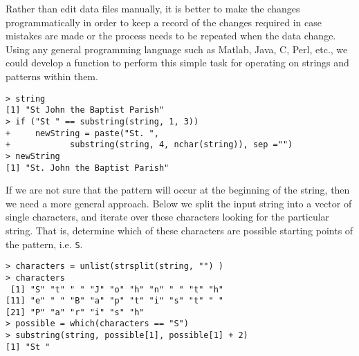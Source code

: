 Rather than edit data files manually, it is better to make the changes
programmatically in order to keep a record of the changes required in
case mistakes are made or the process needs to be repeated when the
data change.  Using any general programming language such as Matlab,
Java, C, Perl, etc., we could develop a function to perform this
simple task for operating on strings and patterns within them.
{\footnotesize{
\begin{verbatim}
> string
[1] "St John the Baptist Parish"
> if ("St " == substring(string, 1, 3))
+     newString = paste("St. ",             
+            substring(string, 4, nchar(string)), sep ="")
> newString
[1] "St. John the Baptist Parish"
\end{verbatim}
}}

If we are not sure that the pattern will occur at the beginning of the
string, then we need a more general approach.  Below we split the
input string into a vector of single characters, and iterate over
these characters looking for the particular string.  That is,
determine which of these characters are possible starting points of
the pattern, i.e. \verb+S+.  
{\footnotesize{
\begin{verbatim}
> characters = unlist(strsplit(string, "") )
> characters
 [1] "S" "t" " " "J" "o" "h" "n" " " "t" "h" 
[11] "e" " " "B" "a" "p" "t" "i" "s" "t" " "
[21] "P" "a" "r" "i" "s" "h"
> possible = which(characters == "S")
> substring(string, possible[1], possible[1] + 2)
[1] "St "
\end{verbatim}
}}

